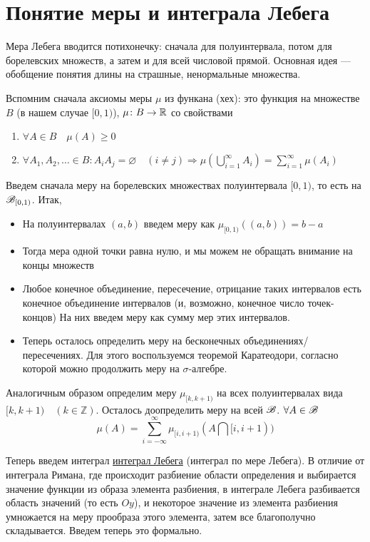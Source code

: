 \section{Понятие меры и интеграла Лебега}

\qquad Мера Лебега вводится потихонечку: сначала для полуинтервала, потом для борелевских множеств, а затем и для всей числовой прямой. Основная идея --- обобщение
понятия длины на страшные, ненормальные множества.

Вспомним сначала аксиомы меры $\mu$ из функана (хех): это функция на множестве $B$ (в нашем случае $[0, 1)$), $\mu \colon B \to \mathbb{R}$ со свойствами
\begin{enumerate}
	\item $\forall A \in B \quad \mu(A) \ge 0$
	\item $\forall A_1, A_2, \ldots \in B \colon A_iA_j = \varnothing \quad (i \not= j) \Rightarrow \mu(\bigcup\limits_{i=1}^\infty A_i) = \sum\limits_{i=1}^\infty \mu(A_i)$
\end{enumerate} 

Введем сначала меру на борелевских множествах полуинтервала $[0, 1)$, то есть на $\mathscr{B}_{[0, 1)}$. Итак, 
\begin{itemize}
	\item На полуинтервалах $(a, b)$ введем меру как $\mu_{[0, 1)}((a, b)) = b - a$
	\item Тогда мера одной точки равна нулю, и мы можем не обращать внимание на концы множеств
	\item Любое конечное объединение, пересечение, отрицание таких интервалов есть конечное объединение интервалов (и, возможно, конечное число точек-концов)
	На них введем меру как сумму мер этих интервалов.
	\item Теперь осталось определить меру на бесконечных объединениях/пересечениях. Для этого воспользуемся теоремой Каратеодори, согласно которой можно продолжить
	меру на $\sigma$-алгебре.
\end{itemize}

Аналогичным образом определим меру $\mu_{[k, k+1)}$ на всех полуинтервалах вида $[k, k+1) \quad (k \in \mathbb{Z})$.
Осталось доопределить меру на всей $\mathscr{B}$. $\forall A \in \mathscr{B} \quad$
 $$\mu(A)=\sum\limits_{i=-\infty}^{\infty}\mu_{[i, i+1)}(A \bigcap [i, i+1))$$
 
 Теперь введем интеграл \underline{интеграл Лебега} (интеграл по мере Лебега). В отличие от интеграла Римана, где происходит разбиение области определения и выбирается
 значение функции из образа элемента разбиения, в интеграле Лебега разбивается область значений (то есть $Oy$), и некоторое значение из элемента разбиения умножается на
 меру прообраза этого элемента, затем все благополучно складывается. Введем теперь это формально.
 
